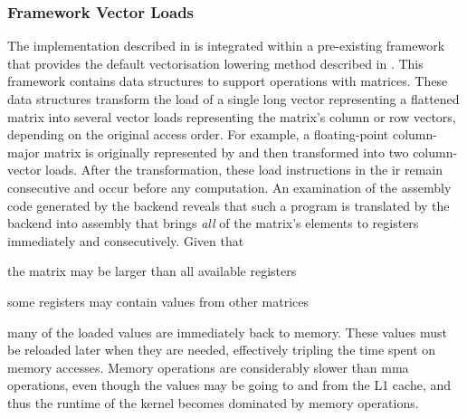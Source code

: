\documentclass[\main/thesis.tex]{subfiles}
\begin{document}
\subsubsection{Framework Vector Loads}
The implementation described in  is integrated within a pre-existing framework that provides the default vectorisation \gls{lowering} method described in .
This framework contains data structures to support operations with matrices.
These data structures transform the load of a single long vector representing a flattened matrix into several vector loads representing the matrix's column or row vectors, depending on the original access order.
For example, a floating-point column-major matrix  is originally represented by  and then transformed into two  column-vector loads.
After the transformation, these load instructions in the \gls{ir} remain consecutive and occur before any computation.
An examination of the assembly code generated by the backend reveals that such a program is translated by the backend into assembly that brings \emph{all} of the matrix's elements to registers immediately and consecutively.
Given that
\begin{enumerate*}[itemjoin={{; }}, itemjoin*={{; or }}, label=(\arabic*), after={,}]
  \item the matrix may be larger than all available registers
  \item some registers may contain values from other matrices
\end{enumerate*}
many of the loaded values are immediately  back to memory.
These values must be reloaded later when they are needed, effectively tripling the time spent on memory accesses.
Memory operations are considerably slower than \gls{mma} operations, even though the values may be going to and from the L1 cache, and thus the runtime of the kernel becomes dominated by memory operations.
\end{document}
